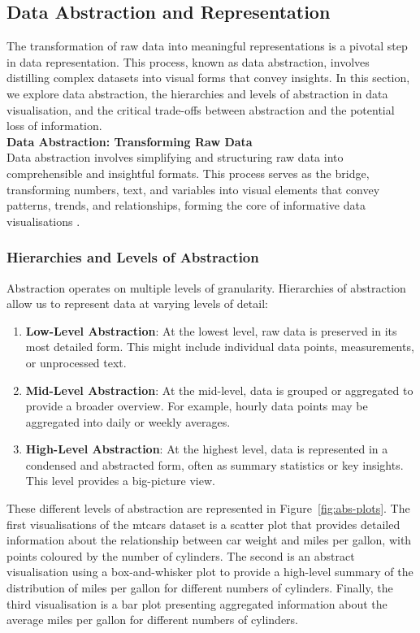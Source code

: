 \documentclass{article}\usepackage[]{graphicx}\usepackage[]{xcolor}
\numberwithin{equation}{section}
\begin{document}
\subsection{Data Abstraction and Representation}
The transformation of raw data into meaningful representations is a pivotal step in data representation. This process, known as data abstraction, involves distilling complex datasets into visual forms that convey insights. In this section, we explore data abstraction, the hierarchies and levels of abstraction in data visualisation, and the critical trade-offs between abstraction and the potential loss of information.\\

\noindent \textbf{Data Abstraction: Transforming Raw Data}\\
Data abstraction involves simplifying and structuring raw data into comprehensible and insightful formats. This process serves as the bridge, transforming numbers, text, and variables into visual elements that convey patterns, trends, and relationships, forming the core of informative data visualisations \cite{tufte2001visual}.

\subsubsection{Hierarchies and Levels of Abstraction}
Abstraction operates on multiple levels of granularity. Hierarchies of abstraction allow us to represent data at varying levels of detail: 
\begin{enumerate}
    \item \textbf{Low-Level Abstraction}: At the lowest level, raw data is preserved in its most detailed form. This might include individual data points, measurements, or unprocessed text.
    \item \textbf{Mid-Level Abstraction}: At the mid-level, data is grouped or aggregated to provide a broader overview. For example, hourly data points may be aggregated into daily or weekly averages.
    \item \textbf{High-Level Abstraction}: At the highest level, data is represented in a condensed and abstracted form, often as summary statistics or key insights. This level provides a big-picture view.
\end{enumerate}

\noindent 
These different levels of abstraction are represented in Figure~\ref{fig:abs-plots}. The first visualisations of the mtcars dataset is a scatter plot that provides detailed information about the relationship between car weight and miles per gallon, with points coloured by the number of cylinders. The second is an abstract visualisation using a box-and-whisker plot to provide a high-level summary of the distribution of miles per gallon for different numbers of cylinders. Finally, the third visualisation is a bar plot presenting aggregated information about the average miles per gallon for different numbers of cylinders.
\end{document}
